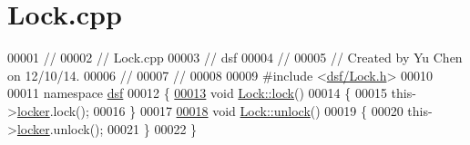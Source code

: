 \hypertarget{_lock_8cpp_source}{}\section{Lock.\+cpp}
\label{_lock_8cpp_source}

\begin{DoxyCode}
00001 \textcolor{comment}{//}
00002 \textcolor{comment}{//  Lock.cpp}
00003 \textcolor{comment}{//  dsf}
00004 \textcolor{comment}{//}
00005 \textcolor{comment}{//  Created by Yu Chen on 12/10/14.}
00006 \textcolor{comment}{//}
00007 \textcolor{comment}{//}
00008 
00009 \textcolor{preprocessor}{#include <\hyperlink{_lock_8h}{dsf/Lock.h}>}
00010 
00011 \textcolor{keyword}{namespace }\hyperlink{namespacedsf}{dsf}
00012 \{
\hypertarget{_lock_8cpp_source_l00013}{}\hyperlink{classdsf_1_1_lock_ae521388d861fe66b9c6e2f09811b0d4b}{00013}     \textcolor{keywordtype}{void} \hyperlink{classdsf_1_1_lock_ae521388d861fe66b9c6e2f09811b0d4b}{Lock::lock}()
00014     \{
00015         this->\hyperlink{classdsf_1_1_lock_a605f27e33e37dc8b3b920a3272461c44}{locker}.lock();
00016     \}
00017     
\hypertarget{_lock_8cpp_source_l00018}{}\hyperlink{classdsf_1_1_lock_a3d03f801920d458b3c3c402a0f4af323}{00018}     \textcolor{keywordtype}{void} \hyperlink{classdsf_1_1_lock_a3d03f801920d458b3c3c402a0f4af323}{Lock::unlock}()
00019     \{
00020         this->\hyperlink{classdsf_1_1_lock_a605f27e33e37dc8b3b920a3272461c44}{locker}.unlock();
00021     \}
00022 \}
\end{DoxyCode}
